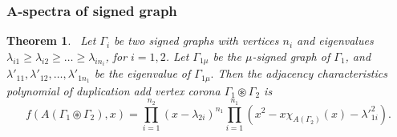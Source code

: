 \documentclass[12pt,a4paper]{article}
\newtheorem{theorem}{Theorem}[section]
\theoremstyle{definition}
\theoremstyle{remark}
\begin{document}
    \subsubsection{A-spectra of signed graph}
        \begin{theorem}~\label{Theorem1}
            Let $\Gamma_i$ be two signed graphs with vertices $n_i$ and eigenvalues $\lambda_{i1}\geq\lambda_{i2}\geq\ldots\geq\lambda_{in_i}$, for $i=1,2$. Let $\Gamma_{1\mu}$ be the $\mu$-signed graph of $\Gamma_1$, and $\lambda'_{11},\lambda'_{12},\ldots,\lambda'_{1n_1}$ be the eigenvalue of $\Gamma_{1\mu}.$ Then the adjacency characteristics polynomial of duplication add vertex corona $\Gamma_1\circledast\Gamma_2$ is
            $$f(A(\Gamma_1\circledast\Gamma_2),x)=\prod_{i=1}^{n_2}(x-\lambda_{2i})^{n_1} \prod_{i=1}^{n_1}(x^2-x\chi_{A(\Gamma_2)}(x)-{\lambda'}_{1i}^2).$$
        \end{theorem}
\end{document}

